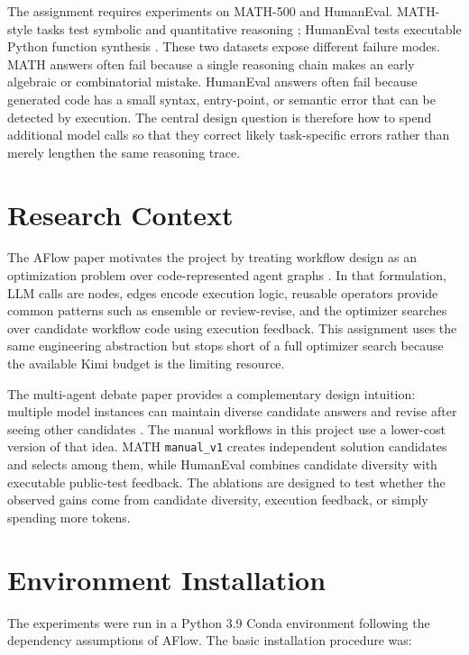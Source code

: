 \documentclass{article}
\begin{document}
The assignment requires experiments on MATH-500 and HumanEval. MATH-style tasks test symbolic and quantitative reasoning \cite{hendrycks2021math}; HumanEval tests executable Python function synthesis \cite{chen2021humaneval}. These two datasets expose different failure modes. MATH answers often fail because a single reasoning chain makes an early algebraic or combinatorial mistake. HumanEval answers often fail because generated code has a small syntax, entry-point, or semantic error that can be detected by execution. The central design question is therefore how to spend additional model calls so that they correct likely task-specific errors rather than merely lengthen the same reasoning trace.

\section{Research Context}

The AFlow paper motivates the project by treating workflow design as an optimization problem over code-represented agent graphs \cite{zhang2025aflow}. In that formulation, LLM calls are nodes, edges encode execution logic, reusable operators provide common patterns such as ensemble or review-revise, and the optimizer searches over candidate workflow code using execution feedback. This assignment uses the same engineering abstraction but stops short of a full optimizer search because the available Kimi budget is the limiting resource.

The multi-agent debate paper provides a complementary design intuition: multiple model instances can maintain diverse candidate answers and revise after seeing other candidates \cite{du2024debate}. The manual workflows in this project use a lower-cost version of that idea. MATH \texttt{manual\_v1} creates independent solution candidates and selects among them, while HumanEval combines candidate diversity with executable public-test feedback. The ablations are designed to test whether the observed gains come from candidate diversity, execution feedback, or simply spending more tokens.

\section{Environment Installation}

The experiments were run in a Python 3.9 Conda environment following the dependency assumptions of AFlow. The basic installation procedure was:
\end{document}
